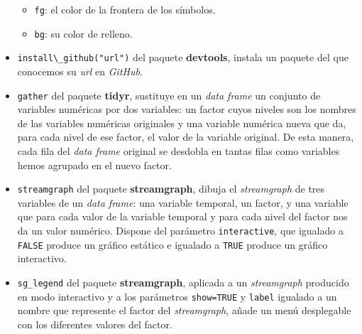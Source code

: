 \documentclass[
]{book}
\theoremstyle{definition}
\theoremstyle{definition}
\theoremstyle{definition}
\theoremstyle{remark}
\begin{document}
\begin{itemize}
  \begin{itemize}
  \item
    \texttt{fg}: el color de la frontera de los símbolos.
  \item
    \texttt{bg}: su color de relleno.
  \end{itemize}
\item
  \verb+install\_github("url")+ del paquete \textbf{devtools}, instala un paquete del que conocemos su \emph{url} en \emph{GitHub}.
\item
  \texttt{gather} del paquete \textbf{tidyr}, sustituye en un \emph{data frame} un conjunto de variables numéricas por dos variables: un factor cuyos niveles son los nombres de las variables numéricas originales y una variable numérica nueva que da, para cada nivel de ese factor, el valor de la variable original. De esta manera, cada fila del \emph{data frame} original se desdobla en tantas filas como variables hemos agrupado en el nuevo factor.
\item
  \texttt{streamgraph} del paquete \textbf{streamgraph}, dibuja el \emph{streamgraph} de tres variables de un \emph{data frame}: una variable temporal, un factor, y una variable que para cada valor de la variable temporal y para cada nivel del factor nos da un valor numérico. Dispone del parámetro \texttt{interactive}, que igualado a \texttt{FALSE} produce un gráfico estático e igualado a \texttt{TRUE} produce un gráfico interactivo.
\item
  \texttt{sg\_legend} del paquete \textbf{streamgraph}, aplicada a un \emph{streamgraph} producido en modo interactivo y a los parámetros \texttt{show=TRUE} y \texttt{label} igualado a un nombre que represente el factor del \emph{streamgraph}, añade un menú desplegable con los diferentes valores del factor.
\end{itemize}
\end{document}
